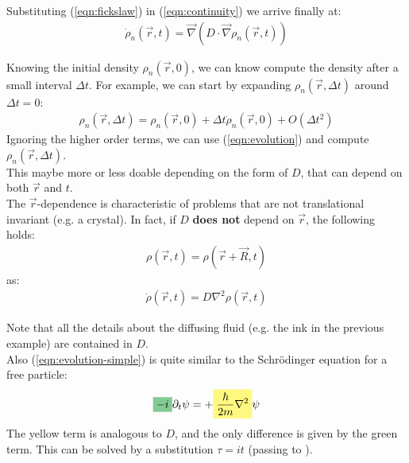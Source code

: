 \documentclass[../template.tex]{subfiles}
\begin{document}
Substituting (\ref{eqn:fickslaw}) in (\ref{eqn:continuity}) we arrive finally at:
\begin{align}
\dot{\rho}_n(\vec{r},t) = \vec{\nabla}(D \cdot \vec{\nabla}\rho_n(\vec{r},t))
\label{eqn:evolution}
\end{align}

Knowing the initial density $\rho_n(\vec{r},0)$, we can know compute the density after a small interval $\Delta t$. For example, we can start by expanding $\rho_n(\vec{r},\Delta t)$ around $\Delta t = 0$:
\begin{align*}
\rho_n(\vec{r},\Delta t) = \rho_n(\vec{r},0) + \Delta t\dot{\rho}_n(\vec{r},0) + O(\Delta t^2)
\end{align*}
Ignoring the higher order terms, we can use (\ref{eqn:evolution}) and compute $\rho_n(\vec{r},\Delta t)$.\\

This maybe more or less doable depending on the form of $D$, that can depend on both $\vec{r}$ and $t$.\\
The $\vec{r}$-dependence is characteristic of problems that are not translational invariant (e.g. a crystal). In fact, if $D$ \textbf{does not} depend on $\vec{r}$, the following holds:
\begin{align*}
\rho(\vec{r},t) = \rho(\vec{r}+\vec{R},t)
\end{align*}
as:
\begin{align}
\dot{\rho}(\vec{r},t) = D\nabla^2 \rho(\vec{r},t)
\label{eqn:evolution-simple}
\end{align}

Note that all the details about the diffusing fluid (e.g. the ink in the previous example) are contained in $D$.\\

Also (\ref{eqn:evolution-simple}) is quite similar to the Schr\"odinger equation for a free particle:
\begin{align*}
\hlc{ForestGreen}{-i} \partial_t \psi = +\hlc{Yellow}{\frac{\hbar}{2m}\nabla^2} \psi
\end{align*}
The yellow term is analogous to $D$, and the only difference is given by the green term. This can be solved by a substitution $\tau = it$ (passing to ).\\
\end{document}

